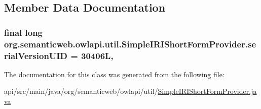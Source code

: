 \subsection{Member Data Documentation}
\hypertarget{classorg_1_1semanticweb_1_1owlapi_1_1util_1_1_simple_i_r_i_short_form_provider_a12125d3d0a9a39edfc627a33d835fe58}{
\subsubsection[{serial\-Version\-U\-I\-D}]{\setlength{\rightskip}{0pt plus 5cm}final long org.\-semanticweb.\-owlapi.\-util.\-Simple\-I\-R\-I\-Short\-Form\-Provider.\-serial\-Version\-U\-I\-D = 30406\-L\hspace{0.3cm}{\ttfamily [static]}, {\ttfamily [private]}}}\label{classorg_1_1semanticweb_1_1owlapi_1_1util_1_1_simple_i_r_i_short_form_provider_a12125d3d0a9a39edfc627a33d835fe58}


The documentation for this class was generated from the following file\-:\begin{DoxyCompactItemize}
\item 
api/src/main/java/org/semanticweb/owlapi/util/\hyperlink{_simple_i_r_i_short_form_provider_8java}{Simple\-I\-R\-I\-Short\-Form\-Provider.\-java}\end{DoxyCompactItemize}

